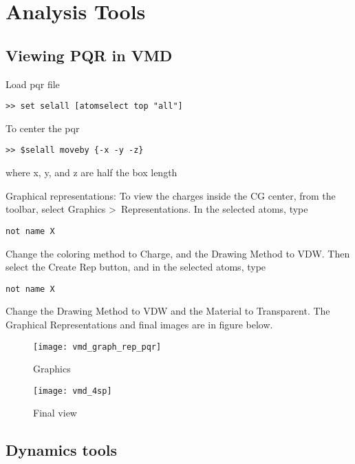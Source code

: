 
\chapter{Analysis Tools}

\section{Viewing PQR in VMD}

Load pqr file
\begin{lstlisting}[style = MyBash]
>> set selall [atomselect top "all"]
\end{lstlisting}

To center the pqr
\begin{lstlisting}[style = MyBash]
>> $selall moveby {-x -y -z}
\end{lstlisting}
where x, y, and z are half the box length

Graphical representations:
To view the charges inside the CG center, from the toolbar, select Graphics \textgreater \,
Representations. In the selected atoms, type
\begin{lstlisting}[style = MyBash]
not name X
\end{lstlisting}

Change the coloring method to Charge, and the Drawing Method to VDW. Then select the 
Create Rep button, and in the selected atoms, type 
\begin{lstlisting}[style = MyBash]
not name X
\end{lstlisting}

 Change the Drawing Method to VDW and the Material to Transparent. 
 The Graphical Representations and final images are in figure below.

\begin{figure}[!htbp]
  \centering
  \begin{minipage}[b]{0.3\textwidth}
    \texttt{[image: vmd\_graph\_rep\_pqr]}
    \caption{Graphics}
  \end{minipage}
  \hfill
  \begin{minipage}[b]{0.65\textwidth}
    \texttt{[image: vmd\_4sp]}
    \caption{Final view}
  \end{minipage}
\end{figure}

\section{Dynamics tools}
